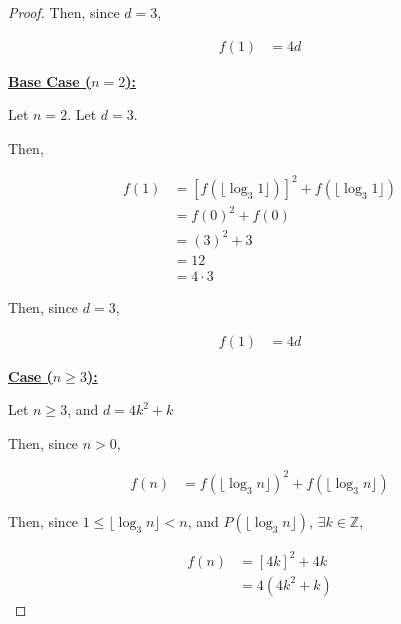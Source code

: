 \documentclass[12pt]{article}
\begin{document}
\begin{enumerate}[a.]
\begin{proof}
        \bigskip

        Then, since $d = 3$,

        \bigskip

        \begin{align}
            f(1) &= 4d
        \end{align}

        \bigskip

        \underline{\textbf{Base Case ($n = 2$):}}

        \bigskip

        Let $n = 2$. Let $d = 3$.

        \bigskip

        Then,

        \begin{align}
            f(1) &= [f(\lfloor \log_3 1 \rfloor)]^2 + f(\lfloor \log_3 1  \rfloor)\\
            &= f(0)^2 + f(0)\\
            &= (3)^2 + 3\\
            &= 12\\
            &= 4 \cdot 3
        \end{align}

        \bigskip

        Then, since $d = 3$,

        \bigskip

        \begin{align}
            f(1) &= 4d
        \end{align}

        \bigskip

        \underline{\textbf{Case ($n \geq 3$):}}

        \bigskip

        Let $n \geq 3$, and $d = 4k^2 + k$

        \bigskip

        Then, since $n > 0$,

        \begin{align}
            f(n) &= f(\lfloor \log_3 n \rfloor)^2 + f(\lfloor \log_3 n \rfloor)
        \end{align}

        \bigskip

        Then, since $1 \leq \lfloor \log_3 n \rfloor < n$, and
        $P(\lfloor \log_3 n \rfloor)$, $\exists k \in \mathbb{Z}$,

        \begin{align}
            f(n) &= [4k]^2 + 4k\\
            &= 4(4k^2 + k)
        \end{align}


\end{proof}
\end{enumerate}
\end{document}
